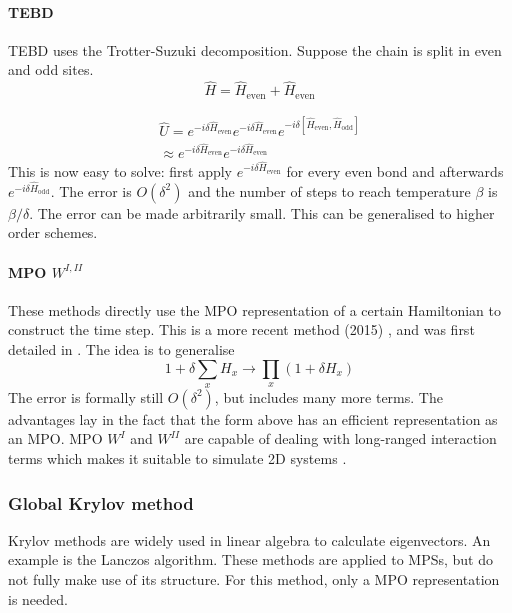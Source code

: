 \paragraph{TEBD}
\Gls{TEBD} uses the Trotter-Suzuki decomposition. Suppose the chain is split in even and odd sites.
\begin{equation}
  \hat{H} = \hat{H}_{\text{even}}+\hat{H}_{\text{even}}
\end{equation}

\begin{equation}\label{trotter_exp}
  \begin{split}
    \hat{U} = e^{-i \delta \hat{H}_{\text{even}}}  e^{-i \delta \hat{H}_{\text{even}} }e^{-i \delta \left[ \hat{H}_{\text{even}}, \hat{H}_{\text{odd}} \right] }\\
    \approx e^{-i \delta \hat{H}_{\text{even}}}  e^{-i \delta \hat{H}_{\text{even}} }
  \end{split}
\end{equation}
This is now easy to solve: first apply $e^{-i \delta \hat{H}_{\text{even}}}$ for every even bond and afterwards  $e^{-i \delta \hat{H}_{\text{odd}}}$. The error is $O(\delta^2)$ and the number of steps to reach temperature $\beta$ is $\beta / \delta$. The error can be made arbitrarily small. This can be generalised to higher order schemes.

\paragraph{ MPO $W^{I,II}$}
These methods directly use the \Gls{MPO} representation of a certain Hamiltonian to construct the time step. This is a more recent method (2015) , and was first detailed in \cite{Zaletel2015}. The idea is to generalise
\begin{equation}
  1+ \delta \sum_x H_x \rightarrow \prod_x (1+  \delta H_x)
\end{equation}
The error is formally still $O(\delta^2)$, but includes many more terms. The advantages lay in the fact that the form above has an efficient representation as an \Gls{MPO}. \Gls{MPO} $W^I$ and $W^{II}$ are capable of dealing with long-ranged interaction terms which makes it suitable to simulate 2D systems \cite{Paeckel2019}.

\subsubsection{Global Krylov method}

Krylov methods are widely used in linear algebra to calculate eigenvectors. An example is the Lanczos algorithm. These methods are applied to \Glspl{MPS}, but do not fully make use of its structure. For this method, only a \Gls{MPO} representation is needed.

